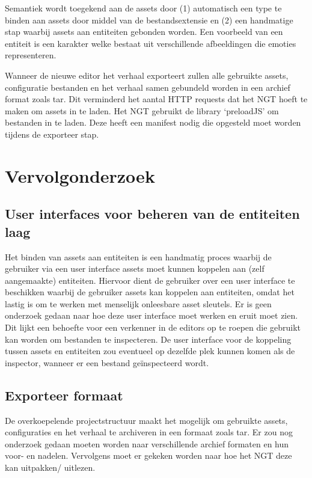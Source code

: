 Semantiek wordt toegekend aan de assets door (1) automatisch een type te binden aan assets door middel van de bestandsextensie en (2) een handmatige stap waarbij assets aan entiteiten gebonden worden. Een voorbeeld van een entiteit is een karakter welke bestaat uit verschillende afbeeldingen die emoties representeren.

Wanneer de nieuwe editor het verhaal exporteert zullen alle gebruikte assets, configuratie bestanden en het verhaal samen gebundeld worden in een archief format zoals tar. Dit verminderd het aantal HTTP requests dat het NGT hoeft te maken om assets in te laden. Het NGT gebruikt de library ‘preloadJS’ om bestanden in te laden. Deze heeft een manifest nodig die opgesteld moet worden tijdens de exporteer stap.

\section{Vervolgonderzoek}
\subsection{User interfaces voor beheren van de entiteiten laag}
Het binden van assets aan entiteiten is een handmatig proces waarbij de gebruiker via een user interface assets moet kunnen koppelen aan (zelf aangemaakte) entiteiten. Hiervoor dient de gebruiker over een user interface te beschikken waarbij de gebruiker assets kan koppelen aan entiteiten, omdat het lastig is om te werken met menselijk onleesbare asset sleutels. Er is geen onderzoek gedaan naar hoe deze user interface moet werken en eruit moet zien. Dit lijkt een behoefte voor een verkenner in de editors op te roepen die gebruikt kan worden om bestanden te inspecteren. De user interface voor de koppeling tussen assets en entiteiten zou eventueel op dezelfde plek kunnen komen als de inspector, wanneer er een bestand geïnspecteerd wordt.

\subsection{Exporteer formaat}
De overkoepelende projectstructuur maakt het mogelijk om gebruikte assets, configuraties en het verhaal te archiveren in een formaat zoals tar. Er zou nog onderzoek gedaan moeten worden naar verschillende archief formaten en hun voor- en nadelen. Vervolgens moet er gekeken worden naar hoe het NGT deze kan uitpakken/ uitlezen.